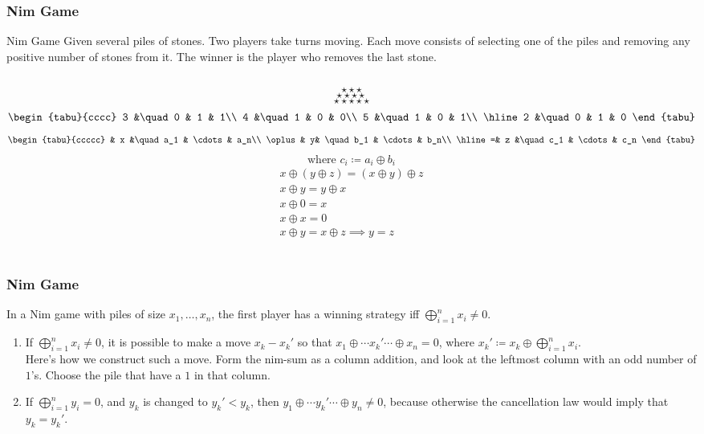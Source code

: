 \documentclass[UTF8,11pt,colorlinks,compress,openany]{beamer}%
\begin{document}
\begin{frame}\frametitle{Nim Game}
\begin{block}{Nim Game}
Given several piles of stones. Two players take turns moving. Each move consists of selecting one of the piles and removing any positive number of stones from it. The winner is the player who removes the last stone.
\end{block}
\begin{columns}
\[\star\star\star\]
\[\star\star\star\star\]
\[\star\star\star\star\star\]
\[
\begin{tabu}{cccc}
3 &\quad	0 & 1 & 1\\
4 &\quad	1 & 0 & 0\\
5 &\quad	1 & 0 & 1\\
	\hline
2 &\quad	0 & 1 & 0
\end{tabu}
\]
\[
\begin{tabu}{ccccc}
& x &\quad	a_1 & \cdots & a_n\\
\oplus & y& \quad	b_1 & \cdots & b_n\\
\hline
=& z &\quad c_1 & \cdots & c_n
\end{tabu}
\]
\[\mbox{where } c_i\coloneqq a_i\oplus b_i\]
\begin{gather*}
x\oplus(y\oplus z) = (x\oplus y)\oplus z\\
x\oplus y = y\oplus x\\
x\oplus 0 = x\\
x\oplus x = 0\\
x\oplus y = x\oplus z\implies y = z\\
\end{gather*}
\end{columns}
\end{frame}

\begin{frame}\frametitle{Nim Game}
\begin{theorem}
In a Nim game with piles of size $x_1,\dots,x_n$, the first player has a winning strategy iff $\bigoplus\limits_{i=1}^n x_i\ne 0$.
\end{theorem}
\begin{enumerate}
	\item If $\bigoplus\limits_{i=1}^n x_i\ne 0$, it is possible to make a move $x_k-x_k'$ so that $x_1\oplus\cdots x_k'\cdots\oplus x_n=0$, where $x_k'\coloneqq x_k\oplus\bigoplus\limits_{i=1}^n x_i$.\\
	Here's how we construct such a move. Form the nim-sum as a column addition, and look at the leftmost column with an odd number of $1$'s. Choose the pile that have a $1$ in that column.
	\item If $\bigoplus\limits_{i=1}^n y_i=0$, and $y_k$ is changed to $y_k'<y_k$, then $y_1\oplus\cdots y_k'\cdots\oplus y_n\ne 0$, because otherwise the cancellation law would imply that $y_k=y_k'$.
\end{enumerate}
\end{frame}
\end{document}
